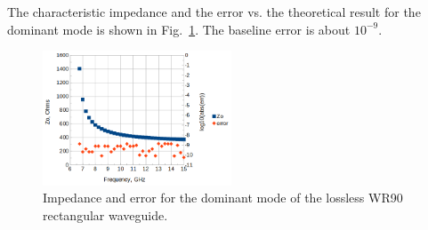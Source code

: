 \documentclass[titlepage]{article}
\renewcommand\_{\textunderscore\linebreak[1]}
\begin{document}
The characteristic impedance and the error vs. the theoretical result for the dominant mode is shown in Fig.~\ref{fig:WR90_impedance}.  The baseline error is about $10^{-9}$.

\begin{figure}[H]
  \centering
  \includegraphics[width=0.5\textwidth]{../regression/OpenParEM2D/WR90_rectangular_waveguide/WR90/WR90_order_6_study/screenshots/WR90_impedance}
  \caption{Impedance and error for the dominant mode of the lossless WR90 rectangular waveguide.}
  \label{fig:WR90_impedance}
\end{figure}
\end{document}
